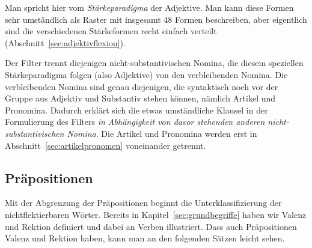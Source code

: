 \begin{exe}
  \ex
  \begin{xlist}
  \end{xlist}
  \ex
  \begin{xlist}
  \end{xlist}
\end{exe}

Man spricht hier vom \textit{Stärkeparadigma} der Adjektive.
Man kann diese Formen sehr umständlich als Raster mit insgesamt 48 Formen beschreiben, aber eigentlich sind die verschiedenen Stärkeformen recht einfach verteilt (Abschnitt~\ref{sec:adjektivflexion}).

Der Filter trennt diejenigen nicht-substantivischen Nomina, die diesem speziellen Stärkeparadigma folgen (also Adjektive) von den verbleibenden Nomina.
Die verbleibenden Nomina sind genau diejenigen, die syntaktisch noch vor der Gruppe aus Adjektiv und Substantiv stehen können, nämlich Artikel und Pronomina.
Dadurch erklärt sich die etwas umständliche Klausel in der Formulierung des Filters \textit{in Abhängigkeit von davor stehenden anderen nicht-substantivischen Nomina}.
Die Artikel und Pronomina werden erst in Abschnitt~\ref{sec:artikelpronomen} voneinander getrennt.


\subsection{Präpositionen}

\label{sec:praepositionenwortklassen}


Mit der Abgrenzung der Präpositionen beginnt die Unterklassifizierung der nichtflektierbaren Wörter. 
Bereits in Kapitel~\ref{sec:grundbegriffe} haben wir Valenz und Rektion definiert und dabei an Verben illustriert.
Dass auch Präpositionen Valenz und Rektion haben, kann man an den folgenden Sätzen leicht sehen.

\begin{exe}
  \ex
  \begin{xlist}
  \end{xlist}
\end{exe}

